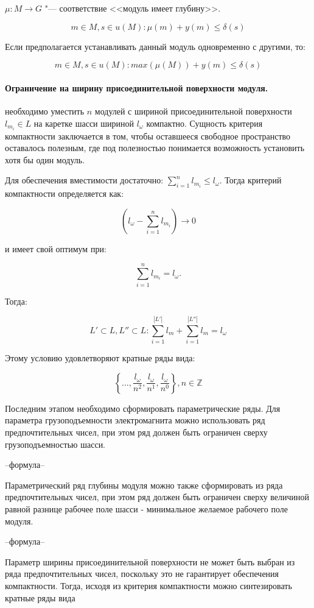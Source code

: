 \noindent $\mu: M \rightarrow G$ "--- соответствие <<модуль имеет глубину>>.
 
\[
m \in M, s \in u(M): \mu(m) + y(m) \leq \delta(s)
\]

Если предполагается устанавливать данный модуль одновременно с другими, то:

\[
m \in M, s \in u(M): max(\mu(M)) + y(m) \leq \delta(s)
\]

\paragraph{Ограничение на ширину присоединительной поверхности модуля.} необходимо уместить $n$ модулей с шириной присоединительной поверхности $l_{m_i} \in L$ на каретке шасси шириной $l_\omega$ компактно. Сущность критерия компактности заключается в том, чтобы оставшееся свободное пространство оставалось полезным, где под полезностью понимается возможность установить хотя бы один модуль.

\noindent Для обеспечения вместимости достаточно: $\sum_{i=1}^{n}l_{m_i} \leq l_\omega$.
\noindent Тогда критерий компактности определяется как: 

\[
\left ( l_\omega - \sum_{i=1}^{n} l_{m_i} \right )\rightarrow 0 
\]

\noindent и имеет свой оптимум при:

\[
\sum_{i=1}^{n} l_{m_i} = l_\omega.
\]

\noindent Тогда:

\[
L' \subset L, L'' \subset L: \sum_{i=1}^{|L'|}l_m + \sum_{i=1}^{|L''|}l_m = l_\omega
\]

Этому условию удовлетворяют кратные ряды вида:

\[
\left \{ \ldots, \frac{l_\omega}{n^2}, \frac{l_\omega}{n^1}, \frac{l_\omega}{n^0} \right \}, n \in \mathbb{Z}
\]


Последним этапом необходимо сформировать параметрические ряды. Для параметра грузоподъемности электромагнита можно использовать ряд предпочтительных чисел, при этом ряд должен быть ограничен сверху грузоподъемностью шасси.

--формула--

Параметрический ряд глубины модуля можно также сформировать из ряда предпочтительных чисел, при этом ряд должен быть ограничен сверху величиной равной разнице  рабочее поле шасси - минимальное желаемое рабочего поле модуля.

--формула--

Параметр ширины присоединительной поверхности не может быть выбран из  ряда предпочтительных чисел, поскольку это не гарантирует обеспечения компактности. Тогда, исходя из критерия компактности можно синтезировать кратные ряды вида 

